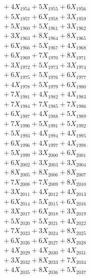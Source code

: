 \documentclass[a4paper,10pt]{article}
\begin{document}
{\begin{align}
&\;  + 4 X_{1954} + 5 X_{1955} + 6 X_{1956} \\[0.3ex]
&\;  + 5 X_{1957} + 6 X_{1958} + 3 X_{1959} \\[0.5ex]\allowbreak
&\;  + 5 X_{1960} + 5 X_{1961} + 3 X_{1962} \\[0.3ex]
&\;  + 3 X_{1963} + 8 X_{1964} + 8 X_{1965} \\[0.3ex]
&\;  + 6 X_{1966} + 5 X_{1967} + 4 X_{1968} \\[0.3ex]
&\;  + 6 X_{1969} + 7 X_{1970} + 8 X_{1971} \\[0.3ex]
&\;  + 3 X_{1972} + 5 X_{1973} + 3 X_{1974} \\[0.3ex]
&\;  + 6 X_{1975} + 5 X_{1976} + 6 X_{1977} \\[0.3ex]
&\;  + 4 X_{1978} + 5 X_{1979} + 6 X_{1980} \\[0.3ex]
&\;  + 7 X_{1981} + 4 X_{1982} + 4 X_{1983} \\[0.3ex]
&\;  + 7 X_{1984} + 7 X_{1985} + 7 X_{1986} \\[0.3ex]
&\;  + 6 X_{1987} + 4 X_{1988} + 5 X_{1989} \\[0.5ex]\allowbreak
&\;  + 7 X_{1990} + 5 X_{1991} + 5 X_{1992} \\[0.3ex]
&\;  + 5 X_{1993} + 4 X_{1994} + 4 X_{1995} \\[0.3ex]
&\;  + 6 X_{1996} + 4 X_{1997} + 4 X_{1998} \\[0.3ex]
&\;  + 5 X_{1999} + 3 X_{2000} + 6 X_{2001} \\[0.3ex]
&\;  + 6 X_{2002} + 3 X_{2003} + 3 X_{2004} \\[0.3ex]
&\;  + 8 X_{2005} + 8 X_{2006} + 8 X_{2007} \\[0.3ex]
&\;  + 7 X_{2008} + 7 X_{2009} + 8 X_{2010} \\[0.3ex]
&\;  + 3 X_{2011} + 4 X_{2012} + 4 X_{2013} \\[0.3ex]
&\;  + 6 X_{2014} + 5 X_{2015} + 6 X_{2016} \\[0.3ex]
&\;  + 3 X_{2017} + 6 X_{2018} + 3 X_{2019} \\[0.5ex]\allowbreak
&\;  + 5 X_{2020} + 5 X_{2021} + 4 X_{2022} \\[0.3ex]
&\;  + 7 X_{2023} + 3 X_{2024} + 8 X_{2025} \\[0.3ex]
&\;  + 6 X_{2026} + 6 X_{2027} + 8 X_{2028} \\[0.3ex]
&\;  + 4 X_{2029} + 4 X_{2030} + 4 X_{2031} \\[0.3ex]
&\;  + 3 X_{2032} + 8 X_{2033} + 7 X_{2034} \\[0.3ex]
&\;  + 4 X_{2035} + 8 X_{2036} + 5 X_{2037} \\[0.3ex]

\end{align}}
\end{document}
